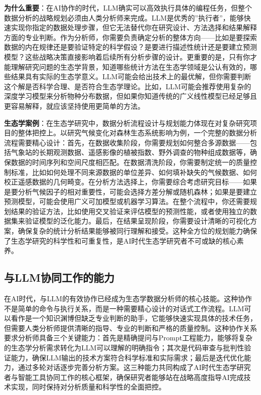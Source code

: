 \documentclass[
]{book}
\begin{document}
\textbf{为什么重要}：在AI协作的时代，LLM确实可以高效执行具体的编程任务，但整个数据分析的战略规划必须由人类分析师来完成。LLM是优秀的''执行者''，能够快速实现你指定的数据处理步骤，但它无法替代你在研究设计、方法选择和结果解释方面的专业判断。作为分析师，你需要负责确定分析的整体方向------比如是要探索数据的内在规律还是要验证特定的科学假设？是要进行描述性统计还是要建立预测模型？这些战略决策直接影响着后续所有分析步骤的设计。更重要的是，只有你才能理解研究问题的生态学背景，知道哪些统计方法在生态学领域是公认有效的，哪些结果具有实际的生态学意义。LLM可能会给出技术上的最优解，但你需要判断这个解是否科学合理、是否符合生态学理论。比如，LLM可能会推荐使用复杂的深度学习模型来分析物种分布数据，但如果你知道传统的广义线性模型已经足够且更容易解释，就应该坚持使用更简单的方法。

\textbf{生态学案例}：在生态学研究中，数据分析流程设计与规划能力体现在对复杂研究项目的整体把控上。以研究气候变化对森林生态系统影响为例，一个完整的数据分析流程需要精心设计：首先，在数据收集阶段，你需要规划如何整合多源数据------包括气象站的长期观测数据、遥感影像的植被指数、野外调查的物种组成数据等，确保数据的时间序列和空间尺度相匹配。在数据清洗阶段，你需要制定统一的质量控制标准，比如如何处理不同来源数据的单位差异、如何填补缺失的气候数据、如何校正遥感数据的几何畸变。在分析方法选择上，你需要综合考虑研究目标------如果是要分析气候因子的相对重要性，可能会选择方差分解或随机森林；如果是要建立预测模型，可能会使用广义可加模型或机器学习算法。在整个流程中，你还需要规划结果的验证方法，比如使用交叉验证来评估模型的预测性能，或者使用独立的数据集来验证模型的泛化能力。最后，在结果呈现阶段，你需要设计清晰的可视化方案，确保复杂的统计分析结果能够被同行理解和接受。这种全方位的规划能力确保了生态学研究的科学性和可重复性，是AI时代生态学研究者不可或缺的核心素养。

\hypertarget{ux4e0ellmux534fux540cux5de5ux4f5cux7684ux80fdux529b}{%
\subsection{与LLM协同工作的能力}\label{ux4e0ellmux534fux540cux5de5ux4f5cux7684ux80fdux529b}}

在AI时代，与LLM的有效协作已经成为生态学数据分析师的核心技能。这种协作不是简单的命令与执行关系，而是一种需要精心设计的对话式工作流程。LLM可以看作是一个知识渊博但缺乏专业判断的助手，它能够快速实现具体的技术任务，但需要人类分析师提供清晰的指导、专业的判断和严格的质量控制。这种协作关系要求分析师具备三个关键能力：首先是精确提问与Prompt工程能力，能够将复杂的生态学分析需求转化为LLM可以理解的明确指令；其次是代码审查与批判性验证能力，确保LLM输出的技术方案符合科学标准和实际需求；最后是迭代优化能力，通过多轮对话逐步完善分析方案。这三种能力共同构成了AI时代生态学研究者与智能工具协同工作的核心框架，确保研究者能够站在战略高度指导AI完成技术实现，同时保持对分析质量和科学性的全面把控。
\end{document}
